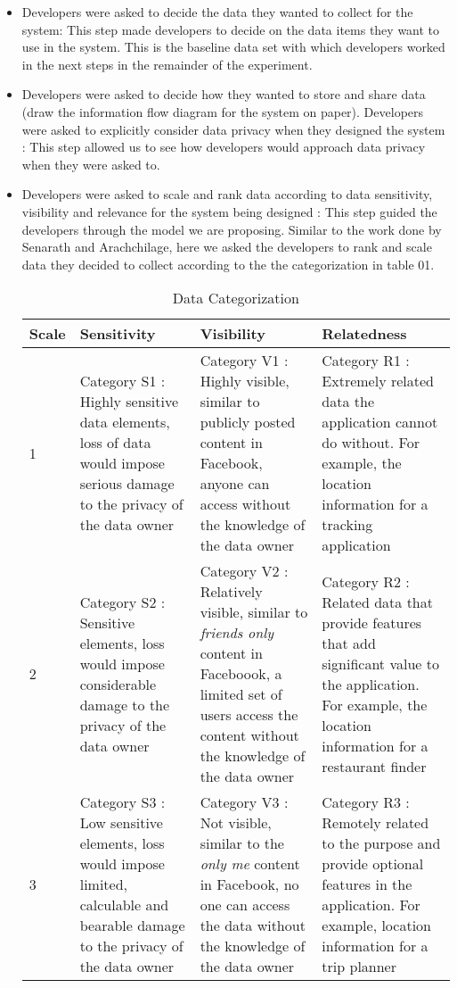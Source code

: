 \documentclass{sigchi}
\begin{document}
\begin{itemize}
\item Developers were asked to decide the data they wanted to collect for the system:  This step made developers to decide on the data items they want to use in the system. This is the baseline data set with which developers worked in the next steps in the remainder of the experiment.
\item Developers were asked to decide how they wanted to store and share data (draw the information flow diagram for the system on paper). Developers were asked to explicitly consider data privacy when they designed the system : This step allowed us to see how developers would approach data privacy when they were asked to.
\item Developers were asked to scale and rank data according to data sensitivity, visibility and relevance for the system being designed : This step guided the developers through the model we are proposing. Similar to the work done by Senarath and Arachchilage, here we asked the developers to rank and scale data they decided to collect according to the the categorization in table 01. 

\begin{center}
\begin{table*}[htbp]
\caption{Data Categorization}
\begin{center}
 \begin{tabular}{|m{2em}|m{14em}|m{14em}|m{14em}|} 
 \hline
\textbf{Scale} & \textbf{ Sensitivity} & \textbf{ Visibility} & \textbf{ Relatedness}\\
\hline
1 & Category S1 : Highly sensitive data elements, loss of data would impose serious damage to the privacy of the data owner &  Category V1 : Highly visible, similar to publicly posted content in Facebook, anyone can access without the knowledge of the data owner & Category R1 : Extremely related data the application cannot do without. For example, the location information for a tracking application\\
\hline
2 & Category S2 : Sensitive elements, loss would impose considerable damage to the privacy of the data owner & Category V2 : Relatively visible, similar to \textit{friends only} content in Faceboook, a limited set of users access the content without the knowledge of the data owner & Category R2 : Related data that provide features that add significant value to the application. For example, the location information for a restaurant finder\\
\hline
3 & Category S3 : Low sensitive elements, loss would impose limited, calculable and bearable damage to the privacy of the data owner & Category V3 : Not visible, similar to the \textit {only me} content in Facebook, no one can access the data without the knowledge of the data owner & Category R3 : Remotely related to the purpose and provide optional features in the application. For example, location information for a trip planner\\
\hline
\end{tabular}
\end{center}
\end{table*}
\end{center}



\end{itemize}
\end{document}
